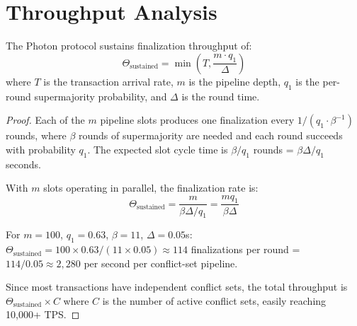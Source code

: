 \section{Throughput Analysis}

\label{sec:photon-throughput}

\begin{theorem}
\label{thm:photon-throughput}
The Photon protocol sustains finalization throughput of:
\[
\Theta_{\text{sustained}} = \min\left(T, \frac{m \cdot q_1}{\Delta}\right)
\]
where $T$ is the transaction arrival rate, $m$ is the pipeline depth, $q_1$ is the
per-round supermajority probability, and $\Delta$ is the round time.
\end{theorem}

\begin{proof}
Each of the $m$ pipeline slots produces one finalization every $1/(q_1 \cdot \beta^{-1})$
rounds, where $\beta$ rounds of supermajority are needed and each round succeeds with
probability $q_1$. The expected slot cycle time is $\beta / q_1$ rounds = $\beta \Delta / q_1$
seconds.

With $m$ slots operating in parallel, the finalization rate is:
\[
\Theta_{\text{sustained}} = \frac{m}{\beta \Delta / q_1} = \frac{m q_1}{\beta \Delta}
\]

For $m = 100$, $q_1 = 0.63$, $\beta = 11$, $\Delta = 0.05$s:
$\Theta_{\text{sustained}} = 100 \times 0.63 / (11 \times 0.05) \approx 114$ finalizations
per round = $114 / 0.05 \approx 2{,}280$ per second per conflict-set pipeline.

Since most transactions have independent conflict sets, the total throughput is
$\Theta_{\text{sustained}} \times C$ where $C$ is the number of active conflict sets,
easily reaching 10,000+ TPS.
\end{proof}

